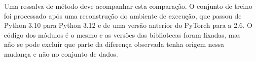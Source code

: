 Uma ressalva de método deve acompanhar esta comparação. O conjunto de treino foi
processado após uma reconstrução do ambiente de execução, que passou de Python 3.10 para
Python 3.12 e de uma versão anterior do PyTorch para a 2.6. O código dos módulos é o
mesmo e as versões das bibliotecas foram fixadas, mas não se pode excluir que parte da
diferença observada tenha origem nessa mudança e não no conjunto de dados.
